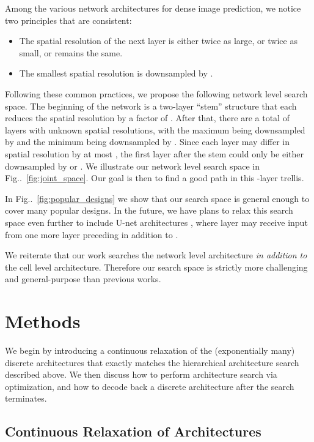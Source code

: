 \documentclass[10pt,twocolumn,letterpaper]{article}
\makeatletter
\def\@onedot{\ifx\@let@token.\else.\null\fi\xspace}
\DeclareRobustCommand\onedot{\futurelet\@let@token\@onedot}
\newcommand{\figref}[1]{Fig\onedot~\ref{#1}}
\makeatother
\begin{document}
Among the various network architectures for dense image prediction, we notice two principles that are consistent:
\begin{itemize}
    \item The spatial resolution of the next layer is either twice as large, or twice as small, or remains the same.
    \item The smallest spatial resolution is downsampled by .
\end{itemize}
Following these common practices, we propose the following network level search space.
The beginning of the network is a two-layer ``stem'' structure that each reduces the spatial resolution by a factor of .
After that, there are a total of  layers with unknown spatial resolutions, with the maximum being downsampled by  and the minimum being downsampled by .
Since each layer may differ in spatial resolution by at most , the first layer after the stem could only be either downsampled by  or .
We illustrate our network level search space in \figref{fig:joint_space}.
Our goal is then to find a good path in this -layer trellis.

In \figref{fig:popular_designs} we show that our search space is general enough to cover many popular designs.
In the future, we have plans to relax this search space even further to include U-net architectures \cite{ronneberger2015u, lin2016feature, shrivastava2016beyond}, where layer  may receive input from one more layer preceding  in addition to .

We reiterate that our work searches the network level architecture \emph{in addition to} the cell level architecture.
Therefore our search space is strictly more challenging and general-purpose than previous works.
 \section{Methods}
\label{sec:methods}

We begin by introducing a continuous relaxation of the (exponentially many) discrete architectures that exactly matches the hierarchical architecture search described above.
We then discuss how to perform architecture search via optimization, and how to decode back a discrete architecture after the search terminates.

\subsection{Continuous Relaxation of Architectures}
\label{sec:relax}
\end{document}

